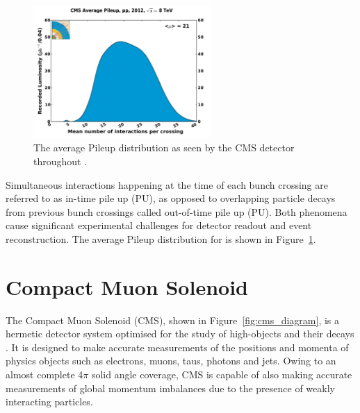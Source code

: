 \begin{figure}
  \centering
  \includegraphics[width=0.6\textwidth]{Figs/machine/pileup_pp_2012.pdf}
  \caption{The average Pileup distribution as seen by the CMS detector
  throughout \runone \cite{cmslumi}.}
  \label{fig:pileup_runone}
\end{figure}

Simultaneous interactions happening at the time
of each bunch crossing are referred to as in-time pile up (PU), as opposed to 
overlapping particle decays from previous bunch crossings called out-of-time 
pile up (PU). Both phenomena cause significant
experimental challenges for detector readout and event reconstruction.
The average Pileup distribution for \runone is shown in
Figure~\ref{fig:pileup_runone}.


\section{Compact Muon Solenoid}  %
\label{sec:detector_overview}

The Compact Muon Solenoid (CMS), shown in Figure~\ref{fig:cms_diagram}, is a
hermetic detector system  optimised for the study of high-\Pt objects and their
decays \cite{CMSexperiment}.
It is designed to make accurate measurements of the positions and momenta of
physics objects such as electrons, muons, taus,
photons and jets. Owing to an almost complete 4$\pi$ solid angle coverage, CMS is 
capable of also making accurate measurements of global momentum imbalances due
to the presence of weakly interacting particles.

